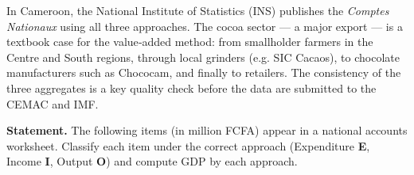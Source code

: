 \documentclass[11pt]{article}
\begin{document}
\begin{savaistu}
In Cameroon, the National Institute of Statistics (INS) publishes the \emph{Comptes Nationaux} using all three approaches.  The cocoa sector — a major export — is a textbook case for the value‑added method: from smallholder farmers in the Centre and South regions, through local grinders (e.g. SIC Cacaos), to chocolate manufacturers such as Chococam, and finally to retailers.  The consistency of the three aggregates is a key quality check before the data are submitted to the CEMAC and IMF.
\end{savaistu}

\begin{exoresolu}
\textbf{Statement.}  The following items (in million FCFA) appear in a national accounts worksheet.  Classify each item under the correct approach (Expenditure \textbf{E}, Income \textbf{I}, Output \textbf{O}) and compute GDP by each approach.


\end{exoresolu}
\end{document}
